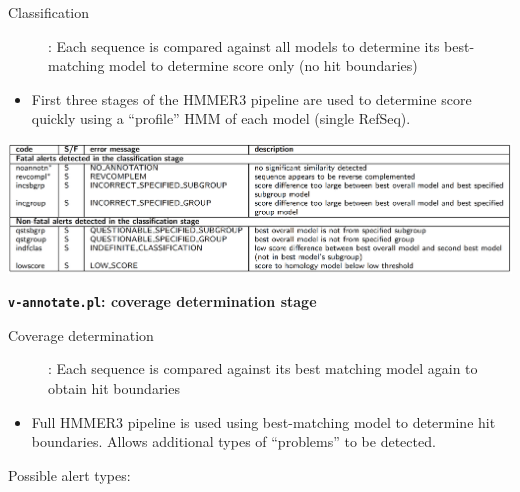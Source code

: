 \documentclass[landscape]{slides}
\begin{document}
\begin{slide}
\begin{center}

\begin{description}
\item[Classification]: Each sequence is compared against all models 
  to determine its best-matching model to determine score only (no
  hit boundaries)
\end{description}

\begin{itemize} 
\item First three stages of the HMMER3 pipeline are used to
  determine score quickly using a ``profile'' HMM of each model
  (single RefSeq).
\end{itemize}

\includegraphics[width=6in]{figs/ss-class-alert-list}

\end{center}
\vfill
\end{slide}
\begin{slide}
\begin{center}
\textbf{\texttt{v-annotate.pl}: coverage determination stage}
\end{center}

\begin{description}
\item[Coverage determination]: Each sequence is compared against
  its best matching model again to obtain hit boundaries
\end{description}

\begin{itemize} 
\item Full HMMER3 pipeline is used using best-matching model to 
  determine hit boundaries. Allows additional types of ``problems'' to
  be detected. 
\end{itemize}

Possible alert types:

\vfill
\end{slide}
\end{document}
